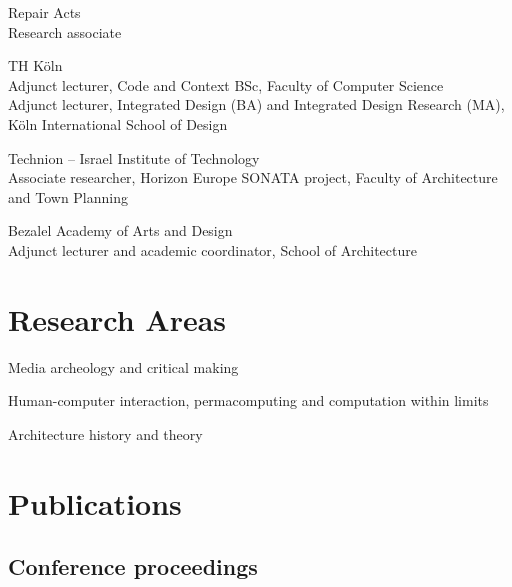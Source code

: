 \documentclass[11pt,letterpaper]{report} %
\newcommand{\listitemspace}{0.25em}
\renewenvironment{itemize}
{
  \begin{list}{}{\setlength{\leftmargin}{0em}
      \setlength{\parskip}{0em}
      \setlength{\itemsep}{\listitemspace}
  \setlength{\parsep}{\listitemspace}}}
  {
\end{list}}
\begin{document}
\begin{tablist}

\item[2026--]   \tab{}Repair Acts \\
  Research associate

\item[2025--]   \tab{}TH Köln \\
  Adjunct lecturer, Code and Context BSc, Faculty of Computer Science \\
  Adjunct lecturer, Integrated Design (BA) and Integrated Design Research (MA), Köln International School of Design

\item[2021--23] \tab{}Technion -- Israel Institute of Technology \\
  Associate researcher, Horizon Europe SONATA project, Faculty of Architecture and Town Planning

\item[2019--23] \tab{}Bezalel Academy of Arts and Design \\
  Adjunct lecturer and academic coordinator, School of Architecture

\end{tablist}

\section*{Research Areas}

\begin{itemize}

  \item Media archeology and critical making
  \item Human-computer interaction, permacomputing and computation within limits
  \item Architecture history and theory

\end{itemize}

\section*{Publications}

\subsection*{Conference proceedings}
\end{document}
